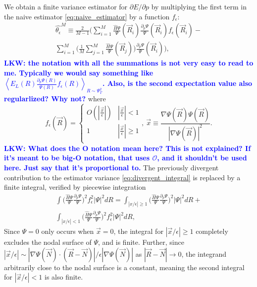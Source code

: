 \documentclass[twocolumn]{revtex4-1}
\newcommand{\lucas}[1]{\textbf{\textcolor{blue}{LKW: #1}}}
\begin{document}
We obtain a finite variance estimator for $\partial E/\partial p$ by multiplying the first term in the naive estimator \eqref{eq:naive_estimator} by a function $f_\epsilon$:
\begin{equation}
\begin{split}
\hat{\theta_\epsilon}^M \equiv \frac{2}{M-1} \Bigg(\sum_{i=1}^M \frac{\hat{H}\Psi}{\Psi}(\vec{R}_i)\frac{\partial_p \Psi}{\Psi}(\vec{R}_i) f_\epsilon(\vec{R}_i) - \\ \sum_{i=1}^M \Big(\frac{1}{M} \sum_{j=1}^M \frac{\hat{H}\Psi}{\Psi}(\vec{R}_j)\Big)\frac{\partial_p \Psi}{\Psi}(\vec{R}_i)\Bigg), \label{eq:regularized_estimator}
\end{split}
\end{equation}
\lucas{the notation with all the summations is not very easy to read to me. Typically we would say something like $\left\langle E_L(R) \frac{\partial_p \Psi(R)}{\Psi(R)} f_\epsilon(R) \right\rangle_{R\sim\Psi_T^2}$. Also, is the second expectation value also regularlized? Why not?}
where 
\begin{equation}
f_\epsilon(\vec{R}) = \begin{cases} 
      O(|\frac{\vec{x}}{\epsilon}|) & |\frac{\vec{x}}{\epsilon}| < 1 \\
      1 & |\frac{\vec{x}}{\epsilon}| \ge 1 \\
   \end{cases},\ \vec{x} \equiv \frac{\nabla \Psi(\vec{R}) \Psi(\vec{R})}{|\nabla \Psi(\vec{R})|^2}.
\label{eq:regularizing_function}
\end{equation} 
\lucas{What does the O notation mean here? This is not explained? If it's meant to be big-O notation, that uses $\mathcal{O}$, and it shouldn't be used here. Just say that it's proportional to.} 
The previously divergent contribution to the estimator variance \eqref{eq:divergent_integral} is replaced by a finite integral, verified by piecewise integration
\begin{equation}
\begin{split}
\int \Big(\frac{\hat{H}\Psi}{\Psi}\frac{\partial_p\Psi}{\Psi}\Big)^2 f_\epsilon^2 |\Psi|^2 dR = \int_{|x/\epsilon|\geq 1} \Big(\frac{\hat{H}\Psi}{\Psi}\frac{\partial_p\Psi}{\Psi}\Big)^2 |\Psi|^2 dR +\\ \int_{|x/\epsilon|< 1} \Big(\frac{\hat{H}\Psi}{\Psi}\frac{\partial_p\Psi}{\Psi}\Big)^2 f_\epsilon^2 |\Psi|^2 dR,
\end{split}
\label{eq:convergent_integral}
\end{equation}
Since $\Psi = 0$ only occurs when $\vec{x} = 0$, the integral for $|\vec{x}/\epsilon|\geq 1$ completely excludes the nodal surface of $\Psi$, and is finite. 
Further, since $|\vec{x}/\epsilon| \sim |\nabla\Psi(\vec{N}) \cdot (\vec{R}-\vec{N})|/\epsilon|\nabla  \Psi(\vec{N})|$ as $|\vec{R} - \vec{N}| \rightarrow 0$, the integrand arbitrarily close to the nodal surface is a constant, meaning the second integral for $|\vec{x}/\epsilon| < 1$ is also finite.
\end{document}
